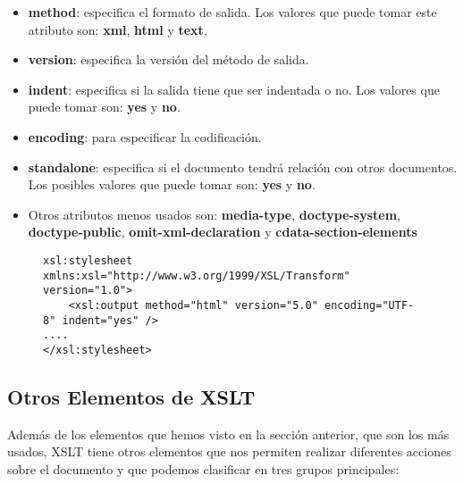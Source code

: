 \begin{itemize}
    \item \textbf{method}: especifica el formato de salida. Los valores que puede tomar este atributo son: \textbf{xml}, \textbf{html} y \textbf{text},
    \item \textbf{version}: especifica la versión del método de salida.
    \item \textbf{indent}: especifica si la salida tiene que ser indentada o no. Los valores que puede tomar son: \textbf{yes} y \textbf{no}.
    \item \textbf{encoding}: para especificar la codificación.
    \item \textbf{standalone}: especifica si el documento tendrá relación con otros documentos. Los posibles valores que puede tomar son: \textbf{yes} y \textbf{no}.
    \item Otros atributos menos usados son: \textbf{media-type}, \textbf{doctype-system}, \textbf{doctype-public}, \textbf{omit-xml-declaration} y \textbf{cdata-section-elements}
\end{itemize}

\begin{figure}[H]
    \begin{tcolorbox}[sharp corners, colback=yellow!30, colframe=white!20]
        \scriptsize
\begin{verbatim}
xsl:stylesheet xmlns:xsl="http://www.w3.org/1999/XSL/Transform" version="1.0">
    <xsl:output method="html" version="5.0" encoding="UTF-8" indent="yes" />
....
</xsl:stylesheet>
\end{verbatim}
    \end{tcolorbox}
\end{figure}

\subsection{Otros Elementos de XSLT}
Además de los elementos que hemos visto en la sección anterior, que son los más usados, XSLT tiene otros elementos que nos permiten realizar diferentes acciones sobre el documento y que podemos clasificar en tres grupos principales:

